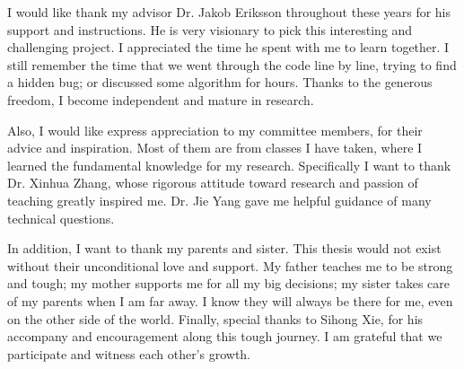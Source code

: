 \acknowledgment

I would like thank my advisor Dr. Jakob Eriksson throughout these years for his support and instructions.
He is very visionary to pick this interesting and challenging project. 
I appreciated the time he spent with me to learn together.
I still remember the time that we went through the code line by line, trying to find a hidden bug; or discussed some algorithm for hours. 
Thanks to the generous freedom, I become independent and mature in research.

Also, I would like express appreciation to my committee members, for their advice and inspiration. Most of them are from classes I have taken, where I learned the fundamental knowledge for my research. Specifically I want to thank Dr. Xinhua Zhang, whose rigorous attitude toward research and passion of teaching greatly inspired me. Dr. Jie Yang gave me helpful guidance of many technical questions.

In addition, I want to thank my parents and sister.
This thesis would not exist without their unconditional love and support. 
My father teaches me to be strong and tough; my mother supports me for all my big decisions; my sister takes care of my parents when I am far away.
I know they will always be there for me, even on the other side of the world.
Finally, special thanks to Sihong Xie, for his accompany and encouragement along this tough journey. 
I am grateful that we participate and witness each other's growth.
